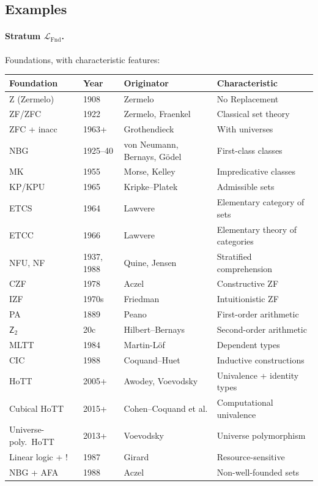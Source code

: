 \documentclass[11pt]{article}
\theoremstyle{plain}
\theoremstyle{definition}
\newcommand{\LFnd}{\mathcal{L}_{\mathrm{Fnd}}}
\begin{document}
\subsection{Examples}

\paragraph{Stratum $\LFnd$.} Foundations, with characteristic features:

\begin{longtable}{@{}p{3.8cm}l p{4cm} p{4.6cm}@{}}
\toprule
Foundation & Year & Originator & Characteristic \\ \midrule
Z (Zermelo) & 1908 & Zermelo & No Replacement \\
ZF/ZFC & 1922 & Zermelo, Fraenkel & Classical set theory \\
ZFC + inacc & 1963+ & Grothendieck & With universes \\
NBG & 1925--40 & von Neumann, Bernays, G\"odel & First-class classes \\
MK & 1955 & Morse, Kelley & Impredicative classes \\
KP/KPU & 1965 & Kripke--Platek & Admissible sets \\
ETCS & 1964 & Lawvere & Elementary category of sets \\
ETCC & 1966 & Lawvere & Elementary theory of categories \\
NFU, NF & 1937, 1988 & Quine, Jensen & Stratified comprehension \\
CZF & 1978 & Aczel & Constructive ZF \\
IZF & 1970s & Friedman & Intuitionistic ZF \\
PA & 1889 & Peano & First-order arithmetic \\
$\mathsf{Z}_2$ & 20c & Hilbert--Bernays & Second-order arithmetic \\
MLTT & 1984 & Martin-L\"of & Dependent types \\
CIC & 1988 & Coquand--Huet & Inductive constructions \\
HoTT & 2005+ & Awodey, Voevodsky & Univalence + identity types \\
Cubical HoTT & 2015+ & Cohen--Coquand et al. & Computational univalence \\
Universe-poly.\ HoTT & 2013+ & Voevodsky & Universe polymorphism \\
Linear logic + ! & 1987 & Girard & Resource-sensitive \\
NBG + AFA & 1988 & Aczel & Non-well-founded sets \\

\end{longtable}
\end{document}
